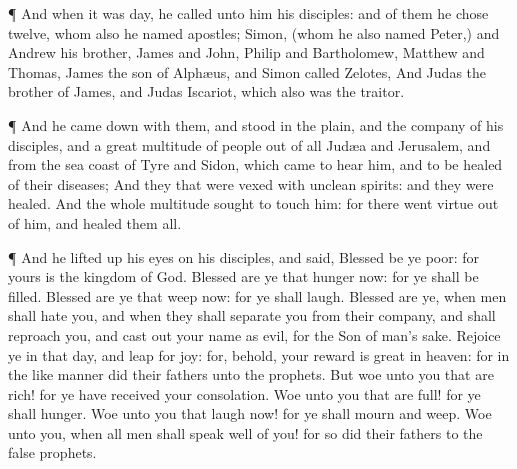  ¶ And when it was day, he called unto him his disciples:
and of them he chose twelve, whom also he named apostles; 
Simon, (whom he also named Peter,) and Andrew his brother, James and
John, Philip and Bartholomew,  Matthew and Thomas, James
the son of Alphæus, and Simon called Zelotes,  And Judas
the brother of James, and Judas Iscariot, which also was the traitor.

 ¶ And he came down with them, and stood in the plain, and
the company of his disciples, and a great multitude of people out of all
Judæa and Jerusalem, and from the sea coast of Tyre and Sidon, which
came to hear him, and to be healed of their diseases;  And
they that were vexed with unclean spirits: and they were healed.
 And the whole multitude sought to touch him: for there
went virtue out of him, and healed them all.

 ¶ And he lifted up his eyes on his disciples, and said,
Blessed be ye poor: for yours is the kingdom of God. 
Blessed are ye that hunger now: for ye shall be filled. Blessed are ye
that weep now: for ye shall laugh.  Blessed are ye, when
men shall hate you, and when they shall separate you from their company,
and shall reproach you, and cast out your name as evil, for the Son of
man's sake.  Rejoice ye in that day, and leap for joy: for,
behold, your reward is great in heaven: for in the like manner did their
fathers unto the prophets.  But woe unto you that are rich!
for ye have received your consolation.  Woe unto you that
are full! for ye shall hunger. Woe unto you that laugh now! for ye shall
mourn and weep.  Woe unto you, when all men shall speak
well of you! for so did their fathers to the false prophets.

